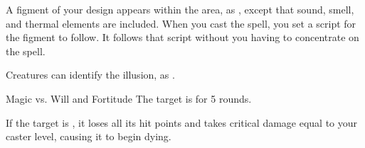 \begin{spellheader}
    \spelldur{\durmed \dismissable}
\end{spellheader}
\begin{spelleffects}
    \spelleffect A figment of your design appears within the area, as , except that sound, smell, and thermal elements are included. When you cast the spell, you set a script for the figment to follow. It follows that script without you having to concentrate on the spell.
\end{spelleffects}
\begin{spellfooter}
    \spellnotes Creatures can identify the illusion, as .
\end{spellfooter}

\begin{spellheader}
    \spellrng{\rngmed}
\end{spellheader}
\begin{spelleffects}
    \begin{spellattack}{Magic vs. Will and Fortitude}
        \spellsuccess[Will] The target is \shaken for 5 rounds.

         If the target is \bloodied, it loses all its hit points and takes critical damage equal to your caster level, causing it to begin dying.
    \end{spellattack}
\end{spelleffects}
\begin{spellfooter}

\end{spellfooter}

